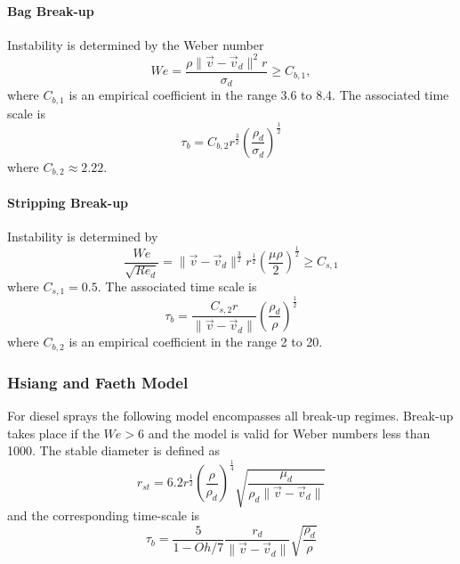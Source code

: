 \documentclass[a4paper,10pt]{article}
\begin{document}
\paragraph{Bag Break-up}
Instability is determined by the Weber number
\begin{equation}
We = \frac{\rho \parallel \vec{v}-\vec{v}_{d} \parallel^2 r}{\sigma_d} \geq C_{b,1},
\end{equation}
where $C_{b,1}$ is an empirical coefficient in the range 3.6 to 8.4.  The associated time scale is
\begin{equation}
\tau_b = C_{b,2} r^{\frac{3}{2}} \left( \frac{ \rho_d }{ \sigma_d } \right)^{\frac{1}{2}}
\end{equation}
where $C_{b,2} \approx 2.22$.



\paragraph{Stripping Break-up}
Instability is determined by
\begin{equation}
\frac{We}{\sqrt{Re_d}} =
\parallel \vec{v}-\vec{v}_{d} \parallel^{\frac{3}{2}} r^{\frac{1}{2}}
\left( \frac{\mu \rho}{2} \right)^{\frac{1}{2}}
\geq C_{s,1}
\end{equation}
where $C_{s,1} = 0.5$.  The associated time scale is
\begin{equation}
\tau_b = \frac{C_{s,2} r}{\parallel \vec{v}-\vec{v}_{d} \parallel}
\left( \frac{ \rho_d }{ \rho } \right)^{\frac{1}{2}}
\end{equation}
where $C_{b,2}$ is an empirical coefficient in the range 2 to 20.



\subsubsection{Hsiang and Faeth Model}
For diesel sprays the following model encompasses all break-up regimes. Break-up takes place if the $We>6$ and the model is valid for Weber numbers less than 1000.  The stable diameter is defined as
\begin{equation}
r_{st} = 6.2 r^{\frac{1}{2}} \left( \frac{\rho}{\rho_d} \right)^{\frac{1}{4}}
\sqrt{\frac{\mu_d}{\rho_d \parallel \vec{v}-\vec{v}_{d} \parallel}}
\end{equation}
and the corresponding time-scale is
\begin{equation}
\tau_b = \frac{5}{1-Oh/7} \frac{r_d}{\parallel \vec{v}-\vec{v}_{d} \parallel}
\sqrt{\frac{\rho_d}{\rho}}
\end{equation}
\end{document}
